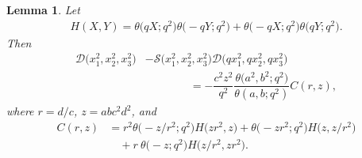 \documentclass[10pt,a4paper]{amsart}
\newtheorem{lemma}{Lemma}
\begin{document}
\begin{lemma}\label{Fund-Lem-1}
Let
\begin{align}
H(X,Y)=\theta\big(qX;q^2\big)\theta\big({-}qY;q^2\big)+\theta\big({-}qX;q^2)
\theta\big(qY;q^2\big).\label{Def-H}
\end{align}
Then
\begin{align}
\mathscr{D}\big(x_1^2,x_2^2,x_3^2\big) &-\mathscr{S}\big(x_1^2,x_2^2,x_3^2\big)
\mathscr{D}\big(qx_1^2,qx_2^2,qx_3^2\big)\nonumber\\
 &\qquad\qquad=-\dfrac{c^2z^2}{q^2}\dfrac{\theta\big(a^2,b^2;q^2\big)}{\theta(a,b;q^2)}
C(r,z),\label{Fund-iden-1}
\end{align}
where $r=d/c$, $z=abc^2d^2$, and
\begin{align}
C(r,z) &=r^2\theta\big({-}z/r^2;q^2\big)H\big(zr^2,z\big)+\theta\big({-}zr^2;q^2\big)
H\big(z,z/r^2\big)\nonumber\\
 &\quad+r\!\:\theta\big({-}z;q^2\big)H\big(z/r^2,zr^2\big).\label{Def-C}
\end{align}
\end{lemma}
\end{document}
